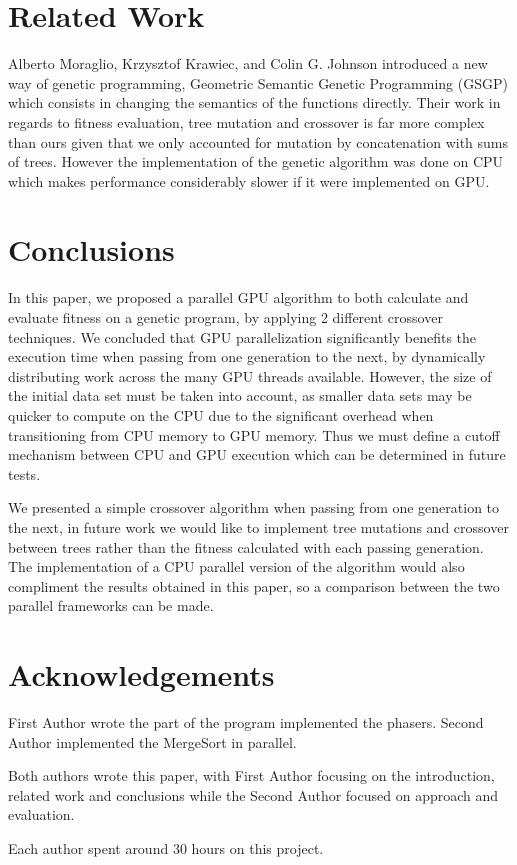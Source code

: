 \documentclass[runningheads]{llncs}
\begin{document}
\section{Related Work}

Alberto Moraglio, Krzysztof Krawiec, and Colin G. Johnson introduced a new way of genetic programming, Geometric Semantic Genetic Programming (GSGP) which consists in changing the semantics of the functions directly. Their work in regards to fitness evaluation, tree mutation and crossover is far more complex than ours given that we only accounted for mutation by concatenation with sums of trees. However the implementation of the genetic algorithm was done on CPU which makes performance considerably slower if it were implemented on GPU.


\section{Conclusions}

In this paper, we proposed a parallel GPU algorithm to both calculate and evaluate fitness on a genetic program, by applying 2 different crossover techniques. We concluded that GPU parallelization significantly benefits the execution time when passing from one generation to the next, by dynamically distributing work across the many GPU threads available. However, the size of the initial data set must be taken into account, as smaller data sets may be quicker to compute on the CPU due to the significant overhead when transitioning from CPU memory to GPU memory. Thus we must define a cutoff mechanism between CPU and GPU execution which can be determined in future tests.

We presented a simple crossover algorithm when passing from one generation to the next, in future work we would like to implement tree mutations and crossover between trees rather than the fitness calculated with each passing generation. The implementation of a CPU parallel version of the algorithm would also compliment the results obtained in this paper, so a comparison between the two parallel frameworks can be made.

\section*{Acknowledgements}

First Author wrote the part of the program implemented the phasers. Second Author implemented the MergeSort in parallel. 

Both authors wrote this paper, with First Author focusing on the introduction, related work and conclusions while the Second Author focused on approach and evaluation.

Each author spent around 30 hours on this project.



\end{document}

